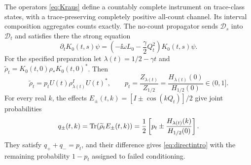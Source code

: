 \begin{theorem}
\label{thm:direct}
The operators \eqref{eq:Kraus} define a countably complete instrument
on trace-class states, with a trace-preserving completely positive
all-count channel. Its interval composition aggregates counts exactly.
The no-count propagator sends $\mathcal D_s$ into $\mathcal D_t$ and
satisfies there the strong equation
\begin{equation}\label{eq:stronglaw}
 \partial_tK_0(t,s)\psi=
 \left(-\ii\omega L_0-\frac\gamma2Q_t^2\right)K_0(t,s)\psi.
\end{equation}
For the specified preparation let
$\lambda(t)=1/2-\gamma t$ and
$\widetilde\rho_t=K_0(t,0)\rho_*K_0(t,0)^*$. Then
\begin{equation}\label{eq:conditional}
 \widetilde\rho_t=p_tU(t)\rho^I_{\lambda(t)}U(t)^*,\qquad
 p_t=\frac{Z_{\lambda(t)}}{Z_{1/2}}
     =\frac{H_{\lambda(t)}(0)}{H_{1/2}(0)}\in(0,1].
\end{equation}
For every real $k$, the effects
$E_\pm(t,k)=[I\pm\cos(kQ_t)]/2$ give joint probabilities
\begin{equation}\label{eq:qpm}
 q_\pm(t,k)=\operatorname{Tr}(\widetilde\rho_tE_\pm(t,k))
 =\frac12\left[p_t\pm\frac{H_{\lambda(t)}(k)}{H_{1/2}(0)}\right].
\end{equation}
They satisfy $q_++q_-=p_t$, and their difference gives
\eqref{eq:directintro} with the remaining probability $1-p_t$ assigned
to failed conditioning.
\end{theorem}

